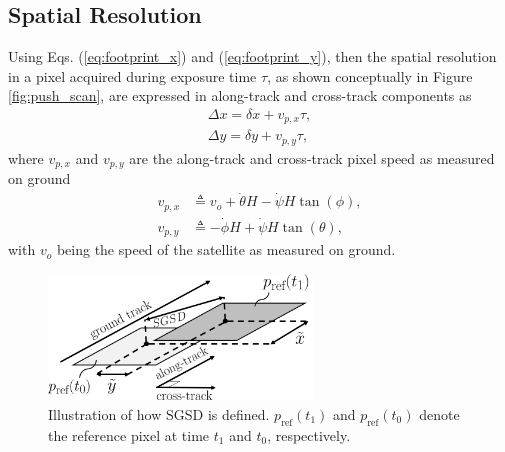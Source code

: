 \subsection{Spatial Resolution}
Using Eqs. (\ref{eq:footprint_x}) and (\ref{eq:footprint_y}), then the spatial resolution in a pixel acquired during exposure time $\tau$, as shown conceptually in Figure \ref{fig:push_scan}, are expressed in along-track and cross-track components as
\begin{subequations}
\begin{align}
    \Delta x=\delta x+v_{p,x}\tau, \label{eq:spatial1_x} \\
    \Delta y=\delta y +v_{p,y}\tau, \label{eq:spatial1_y}
\end{align}
\end{subequations}
\noindent where $v_{p,x}$ and $v_{p,y}$ are the along-track and cross-track pixel speed as measured on ground
\begin{subequations}
\begin{align}
    v_{p,x} & \triangleq v_{o}
+\dot{\theta}H-\dot{\psi}H\tan(\phi), \label{eq:rotational_vel1} \\
    v_{p,y} & \triangleq -\dot{\phi}H+\dot{\psi}H\tan(\theta), \label{eq:rotational_vel2}
\end{align}
\end{subequations}
\noindent with $v_o$ being the speed of the satellite as measured on ground. 
\begin{figure}[htbp]
  \begin{center}
    \includegraphics[width=70mm,angle=0]{figs/SGSD.png}
    \caption{Illustration of how SGSD is defined. $p_{\text{ref}}(t_1)$ and $p_{\text{ref}}(t_0)$ denote the reference pixel at time $t_1$ and $t_0$, respectively.} 
    \label{fig:SGSD}
\end{center}
\end{figure}
